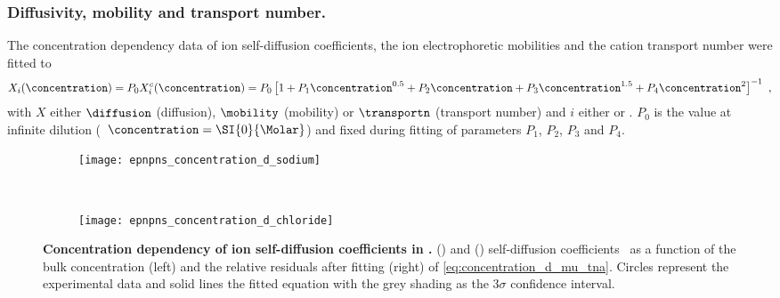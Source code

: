 \subsubsection{Diffusivity, mobility and transport number.}
%
The  concentration dependency data of ion self-diffusion coefficients, the ion electrophoretic
mobilities and the cation transport number were fitted to
%
\begin{align}\label{eq:concentration_d_mu_tna}
  X_{i} (\concentration) = P_0 X_{i}^c (\concentration) =
  P_0 \left[ 1
           + P_1 \concentration^{0.5}
           + P_2 \concentration
           + P_3 \concentration^{1.5}
           + P_4 \concentration^2 
      \right]^{-1}
  \text{ ,}
\end{align}
%
with $X$ either $\diffusion$ (diffusion), $\mobility$ (mobility) or $\transportn$ (transport number) and $i$
either \Na{} or \Cl{}. $P_0$ is the value at infinite dilution (\ie~$\concentration = \SI{0}{\Molar}$) and
fixed during fitting of parameters $P_1$, $P_2$, $P_3$ and $P_4$.

%
\begin{figure*}[!b]
  \centering

  \begin{subfigure}[t]{11cm}
    \centering
    \caption{}\vspace{-1mm}\label{fig:epnpns_concentration_d_sodium}
    \texttt{[image: epnpns\_concentration\_d\_sodium]}
  \end{subfigure}
  \\
  \begin{subfigure}[t]{11cm}
    \centering
    \caption{}\vspace{-1mm}\label{fig:epnpns_concentration_d_chloride}
    \texttt{[image: epnpns\_concentration\_d\_chloride]}
  \end{subfigure}

  \caption[Concentration dependency of ion self-diffusion coefficients in .]%
    {%
      \textbf{Concentration dependency of ion self-diffusion coefficients in .}
      ()
      \Na{} and
      ()
      \Cl{} self-diffusion coefficients~\cite{Mills-1989} as a function of the bulk  concentration
      (left) and the relative residuals after fitting (right) of \cref{eq:concentration_d_mu_tna}. Circles
      represent the experimental data and solid lines the fitted equation with the grey shading as the
      $3\sigma$ confidence interval.
  }\label{fig:epnpns_concentration_d}
\end{figure*}
%

